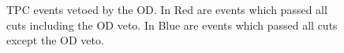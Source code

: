 \begin{figure}[!htbp]%
\centering
{}
    \caption{TPC events vetoed by the OD. In Red are events which passed all cuts including the OD veto. In Blue are events which passed all cuts except the OD veto.}
    \label{fig:sr1_vetoed_events}
\end{figure}